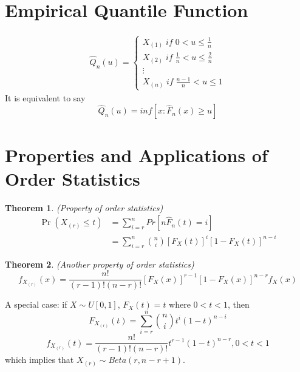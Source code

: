 \documentclass[twoside]{article}
\newtheorem*{theorem*}{Theorem}
\begin{document}
	\section{Empirical Quantile Function}
	\begin{align*}
		\hat{Q}_n (u) = \begin{cases}
			X_{(1)} \; if \; 0 < u \leqslant \frac{1}{n} \\
			X_{(2)} \; if \; \frac{1}{n} < u \leqslant \frac{2}{n} \\
			\vdots \\
			X_{(n)} \; if \; \frac{n-1}{n} < u \leqslant 1
		\end{cases}
	\end{align*}
	It is equivalent to say 
	$$
	\hat{Q}_n (u) = inf \left[ x: \hat{F}_n (x) \geqslant u \right]
	$$
	\section{Properties and Applications of Order Statistics}
	\begin{theorem*}
		(Property of order statistics)
		\begin{align*}
			\Pr \left( X_{(r)} \leqslant t \right) &= \sum_{i = r}^n Pr \left[ n \hat{F}_n (t) = i \right] \\
			&= \sum_{i = r}^n \binom{n}{i} [F_X (t)]^i [1 - F_X (t)]^{n-i}
		\end{align*}
	\end{theorem*}
	\begin{theorem*}
		(Another property of order statistics)
		$$
		f_{X_{(r)}}(x) = \frac{n !}{(r - 1)! (n - r)!} [F_X(x)]^{r-1}[1-F_X(x)]^{n-r}f_X(x)
		$$
	\end{theorem*}
	A special case: if $X \sim U[0,1]$, $F_X(t) = t$ where $0 < t < 1$, then
	$$
	F_{X_{(r)}}(t) = \sum_{i=r}^n \binom{n}{i} t^i (1 - t)^{n-i}
	$$
	$$
	f_{X_{(r)}} (t) = \frac{n!}{(r-1)!(n-r)!} t^{r-1} (1-t)^{n-r}, 0<t<1
	$$
	which implies that $X_{(r)} \sim Beta(r, n-r+1)$. 
	
\end{document}
